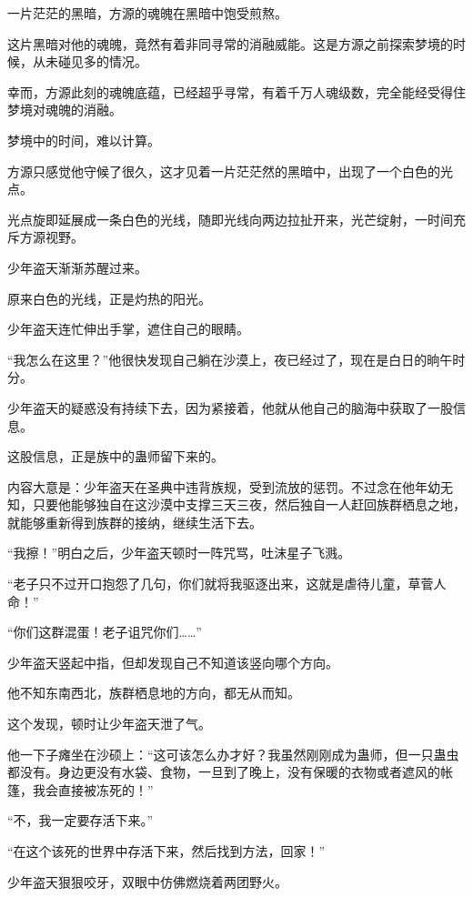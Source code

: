 
\begin{this_body}

一片茫茫的黑暗，方源的魂魄在黑暗中饱受煎熬。

这片黑暗对他的魂魄，竟然有着非同寻常的消融威能。这是方源之前探索梦境的时候，从未碰见多的情况。

幸而，方源此刻的魂魄底蕴，已经超乎寻常，有着千万人魂级数，完全能经受得住梦境对魂魄的消融。

梦境中的时间，难以计算。

方源只感觉他守候了很久，这才见着一片茫茫然的黑暗中，出现了一个白色的光点。

光点旋即延展成一条白色的光线，随即光线向两边拉扯开来，光芒绽射，一时间充斥方源视野。

少年盗天渐渐苏醒过来。

原来白色的光线，正是灼热的阳光。

少年盗天连忙伸出手掌，遮住自己的眼睛。

“我怎么在这里？”他很快发现自己躺在沙漠上，夜已经过了，现在是白日的晌午时分。

少年盗天的疑惑没有持续下去，因为紧接着，他就从他自己的脑海中获取了一股信息。

这股信息，正是族中的蛊师留下来的。

内容大意是：少年盗天在圣典中违背族规，受到流放的惩罚。不过念在他年幼无知，只要他能够独自在这沙漠中支撑三天三夜，然后独自一人赶回族群栖息之地，就能够重新得到族群的接纳，继续生活下去。

“我擦！”明白之后，少年盗天顿时一阵咒骂，吐沫星子飞溅。

“老子只不过开口抱怨了几句，你们就将我驱逐出来，这就是虐待儿童，草菅人命！”

“你们这群混蛋！老子诅咒你们……”

少年盗天竖起中指，但却发现自己不知道该竖向哪个方向。

他不知东南西北，族群栖息地的方向，都无从而知。

这个发现，顿时让少年盗天泄了气。

他一下子瘫坐在沙硕上：“这可该怎么办才好？我虽然刚刚成为蛊师，但一只蛊虫都没有。身边更没有水袋、食物，一旦到了晚上，没有保暖的衣物或者遮风的帐篷，我会直接被冻死的！”

“不，我一定要存活下来。”

“在这个该死的世界中存活下来，然后找到方法，回家！”

少年盗天狠狠咬牙，双眼中仿佛燃烧着两团野火。


\end{this_body}
